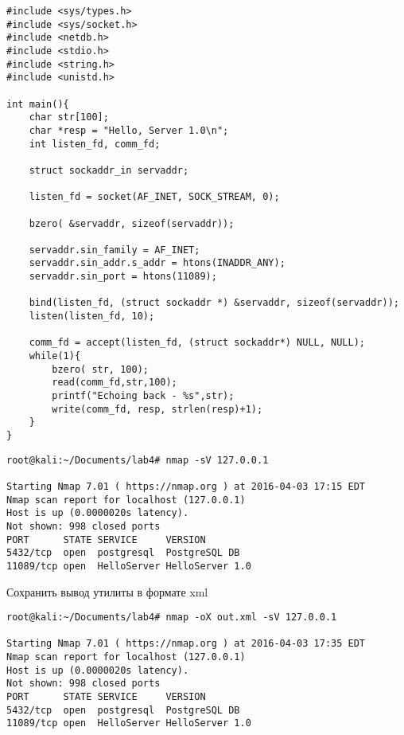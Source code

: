 \documentclass[12pt,a4paper]{report}
\begin{document}
\begin{verbatim}
#include <sys/types.h>
#include <sys/socket.h>
#include <netdb.h>
#include <stdio.h>
#include <string.h>
#include <unistd.h>
 
int main(){
    char str[100];
	char *resp = "Hello, Server 1.0\n";
    int listen_fd, comm_fd;
 
    struct sockaddr_in servaddr;
 
    listen_fd = socket(AF_INET, SOCK_STREAM, 0);
 
    bzero( &servaddr, sizeof(servaddr));
 
    servaddr.sin_family = AF_INET;
    servaddr.sin_addr.s_addr = htons(INADDR_ANY);
    servaddr.sin_port = htons(11089);
 
    bind(listen_fd, (struct sockaddr *) &servaddr, sizeof(servaddr)); 
    listen(listen_fd, 10); 

    comm_fd = accept(listen_fd, (struct sockaddr*) NULL, NULL); 
    while(1){ 
        bzero( str, 100); 
        read(comm_fd,str,100); 
        printf("Echoing back - %s",str); 
        write(comm_fd, resp, strlen(resp)+1); 
    }
}
\end{verbatim}

\begin{verbatim}
root@kali:~/Documents/lab4# nmap -sV 127.0.0.1

Starting Nmap 7.01 ( https://nmap.org ) at 2016-04-03 17:15 EDT
Nmap scan report for localhost (127.0.0.1)
Host is up (0.0000020s latency).
Not shown: 998 closed ports
PORT      STATE SERVICE     VERSION
5432/tcp  open  postgresql  PostgreSQL DB
11089/tcp open  HelloServer HelloServer 1.0
\end{verbatim}

Сохранить вывод утилиты в формате xml

\begin{verbatim}
root@kali:~/Documents/lab4# nmap -oX out.xml -sV 127.0.0.1

Starting Nmap 7.01 ( https://nmap.org ) at 2016-04-03 17:35 EDT
Nmap scan report for localhost (127.0.0.1)
Host is up (0.0000020s latency).
Not shown: 998 closed ports
PORT      STATE SERVICE     VERSION
5432/tcp  open  postgresql  PostgreSQL DB
11089/tcp open  HelloServer HelloServer 1.0
\end{verbatim}
\end{document}
